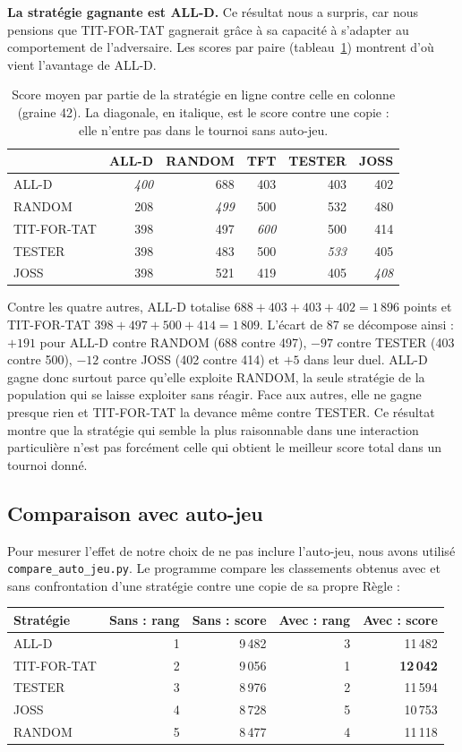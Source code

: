 \documentclass[10pt,a4paper]{article}
\begin{document}
\textbf{La stratégie gagnante est ALL-D.} Ce résultat nous a surpris, car nous pensions que TIT-FOR-TAT gagnerait grâce à sa
capacité à s'adapter au comportement de l'adversaire. Les scores par paire (tableau~\ref{tab:matrice}) montrent d'où vient
l'avantage de ALL-D.

\begin{table}[htbp]
\centering
\small
\begin{tabular}{@{}lrrrrr@{}}
\toprule
  & ALL-D & RANDOM & TFT & TESTER & JOSS \\
\midrule
ALL-D & \textit{400} & 688 & 403 & 403 & 402 \\
RANDOM & 208 & \textit{499} & 500 & 532 & 480 \\
TIT-FOR-TAT & 398 & 497 & \textit{600} & 500 & 414 \\
TESTER & 398 & 483 & 500 & \textit{533} & 405 \\
JOSS & 398 & 521 & 419 & 405 & \textit{408} \\
\bottomrule
\end{tabular}
\caption{Score moyen par partie de la stratégie en ligne contre celle en colonne (graine 42). La diagonale, en italique, est
le score contre une copie : elle n'entre pas dans le tournoi sans auto-jeu.}
\label{tab:matrice}
\end{table}

Contre les quatre autres, ALL-D totalise $688+403+403+402=1\,896$ points et TIT-FOR-TAT $398+497+500+414=1\,809$. L'écart de 87
se décompose ainsi : $+191$ pour ALL-D contre RANDOM (688 contre 497), $-97$ contre TESTER (403 contre 500), $-12$ contre JOSS
(402 contre 414) et $+5$ dans leur duel. ALL-D gagne donc surtout parce qu'elle exploite RANDOM, la seule stratégie de la
population qui se laisse exploiter sans réagir. Face aux autres, elle ne gagne presque rien et TIT-FOR-TAT la devance même
contre TESTER. Ce résultat montre que la stratégie qui semble la plus raisonnable dans une interaction particulière n'est pas
forcément celle qui obtient le meilleur score total dans un tournoi donné.

\subsection{Comparaison avec auto-jeu}
Pour mesurer l'effet de notre choix de ne pas inclure l'auto-jeu, nous avons utilisé \texttt{compare\_auto\_jeu.py}. Le
programme compare les classements obtenus avec et sans confrontation d'une stratégie contre une copie de sa propre Règle :
\begin{center}
\small
\begin{tabular}{@{}lrrrr@{}}
\toprule
Stratégie & Sans : rang & Sans : score & Avec : rang & Avec : score \\
\midrule
ALL-D & 1 & 9\,482 & 3 & 11\,482 \\
TIT-FOR-TAT & 2 & 9\,056 & 1 & \textbf{12\,042} \\
TESTER & 3 & 8\,976 & 2 & 11\,594 \\
JOSS & 4 & 8\,728 & 5 & 10\,753 \\
RANDOM & 5 & 8\,477 & 4 & 11\,118 \\
\bottomrule
\end{tabular}
\end{center}
\end{document}

